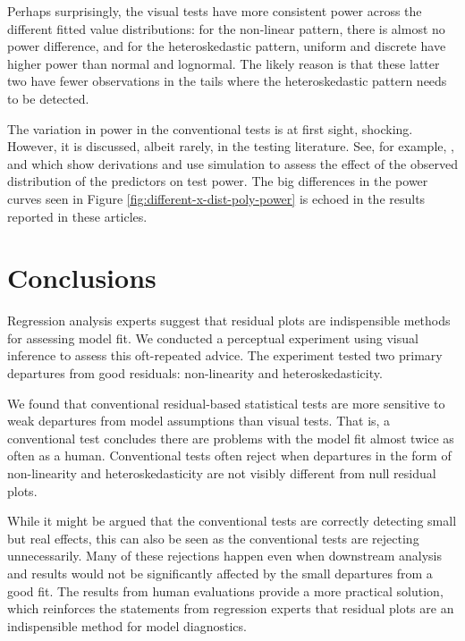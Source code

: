 \documentclass[]{interact}
\theoremstyle{plain}%
\theoremstyle{definition}
\theoremstyle{remark}
\begin{document}
Perhaps surprisingly, the visual tests have more consistent power across
the different fitted value distributions: for the non-linear pattern,
there is almost no power difference, and for the heteroskedastic
pattern, uniform and discrete have higher power than normal and
lognormal. The likely reason is that these latter two have fewer
observations in the tails where the heteroskedastic pattern needs to be
detected.

The variation in power in the conventional tests is at first sight,
shocking. However, it is discussed, albeit rarely, in the testing
literature. See, for example, \citet{jamshidian2007study},
\citet{olvera2019relationship} and \citet{zhang2018practical} which show
derivations and use simulation to assess the effect of the observed
distribution of the predictors on test power. The big differences in the
power curves seen in Figure \ref{fig:different-x-dist-poly-power} is
echoed in the results reported in these articles.

\hypertarget{conclusions}{%
\section{Conclusions}\label{conclusions}}

Regression analysis experts suggest that residual plots are
indispensible methods for assessing model fit. We conducted a perceptual
experiment using visual inference to assess this oft-repeated advice.
The experiment tested two primary departures from good residuals:
non-linearity and heteroskedasticity.

We found that conventional residual-based statistical tests are more
sensitive to weak departures from model assumptions than visual tests.
That is, a conventional test concludes there are problems with the model
fit almost twice as often as a human. Conventional tests often reject
when departures in the form of non-linearity and heteroskedasticity are
not visibly different from null residual plots.

While it might be argued that the conventional tests are correctly
detecting small but real effects, this can also be seen as the
conventional tests are rejecting unnecessarily. Many of these rejections
happen even when downstream analysis and results would not be
significantly affected by the small departures from a good fit. The
results from human evaluations provide a more practical solution, which
reinforces the statements from regression experts that residual plots
are an indispensible method for model diagnostics.
\end{document}
